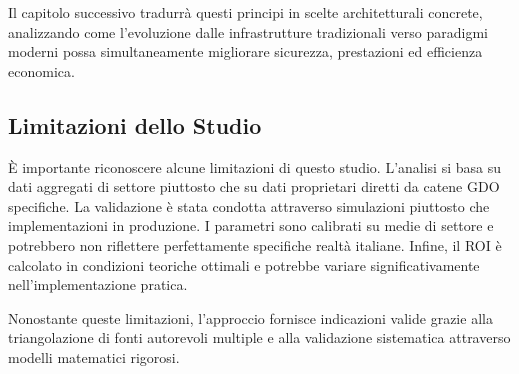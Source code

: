 Il capitolo successivo tradurrà questi principi in scelte architetturali concrete, analizzando come l'evoluzione dalle infrastrutture tradizionali verso paradigmi moderni possa simultaneamente migliorare sicurezza, prestazioni ed efficienza economica.

\subsection*{Limitazioni dello Studio}

È importante riconoscere alcune limitazioni di questo studio. L'analisi si basa su dati aggregati di settore piuttosto che su dati proprietari diretti da catene GDO specifiche. La validazione è stata condotta attraverso simulazioni piuttosto che implementazioni in produzione. I parametri sono calibrati su medie di settore e potrebbero non riflettere perfettamente specifiche realtà italiane. Infine, il ROI è calcolato in condizioni teoriche ottimali e potrebbe variare significativamente nell'implementazione pratica.

Nonostante queste limitazioni, l'approccio fornisce indicazioni valide grazie alla triangolazione di fonti autorevoli multiple e alla validazione sistematica attraverso modelli matematici rigorosi.

\clearpage
\printbibliography[
    heading=subbibliography,
    title={Riferimenti Bibliografici del Capitolo 2},
]
